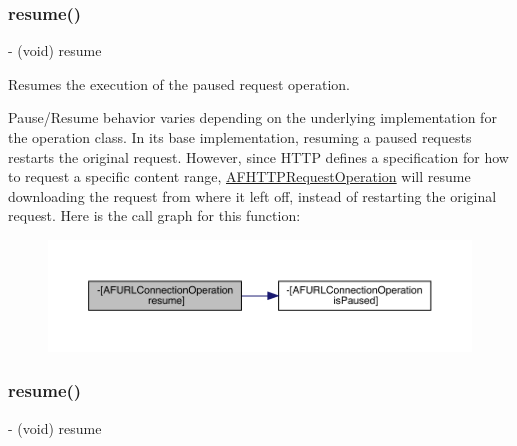 \subsubsection{\texorpdfstring{resume()}{resume()}\hspace{0.1cm}{\footnotesize\ttfamily [1/3]}}
{\footnotesize\ttfamily -\/ (void) resume \begin{DoxyParamCaption}{ }\end{DoxyParamCaption}}

Resumes the execution of the paused request operation.

Pause/\+Resume behavior varies depending on the underlying implementation for the operation class. In its base implementation, resuming a paused requests restarts the original request. However, since H\+T\+TP defines a specification for how to request a specific content range, {\ttfamily \mbox{\hyperlink{interface_a_f_h_t_t_p_request_operation}{A\+F\+H\+T\+T\+P\+Request\+Operation}}} will resume downloading the request from where it left off, instead of restarting the original request. Here is the call graph for this function\+:\nopagebreak
\begin{figure}[H]
\begin{center}
\leavevmode
\includegraphics[width=350pt]{interface_a_f_u_r_l_connection_operation_ae67c1478ba17af4426ca7152251da473_cgraph}
\end{center}
\end{figure}
\mbox{\label{interface_a_f_u_r_l_connection_operation_ae67c1478ba17af4426ca7152251da473}} 
\subsubsection{\texorpdfstring{resume()}{resume()}\hspace{0.1cm}{\footnotesize\ttfamily [2/3]}}
{\footnotesize\ttfamily -\/ (void) resume \begin{DoxyParamCaption}{ }\end{DoxyParamCaption}}

